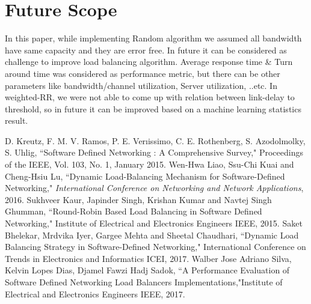 \documentclass[letterpaper, 10 pt, conference]{IEEEtran}
\begin{document}
\section{Future Scope}
\label{sec:conclusion}

In this paper, while implementing Random algorithm we assumed all bandwidth have same capacity and they are error free. In future it can be considered as challenge to improve load balancing algorithm. Average response time \& Turn around time was considered as performance metric, but there can be other parameters like bandwidth/channel utilization, Server utilization, ..etc. In weighted-RR, we were not able to come up with relation between link-delay to threshold, so in future it can be improved based on a machine learning statistics result.

 
\addtolength{\textheight}{-12cm}   %









\begin{thebibliography}{99}
 D. Kreutz, F. M. V. Ramos, P. E. Verıissimo, C. E. Rothenberg, S. Azodolmolky, S. Uhlig, ``Software Defined Networking : A Comprehensive Survey," Proceedings of the IEEE, Vol. 103, No. 1, January 2015.
 Wen-Hwa Liao, Ssu-Chi Kuai and Cheng-Hsiu Lu, ``Dynamic Load-Balancing Mechanism for Software-Defined Networking," {\it International Conference on Networking and Network Applications}, 2016.
 Sukhveer Kaur, Japinder Singh, Krishan Kumar and Navtej Singh Ghumman, ``Round-Robin Based Load Balancing in Software Defined Networking," Institute of Electrical and Electronics Engineers IEEE, 2015.
 Saket Bhelekar, Mrdvika Iyer, Gargee Mehta and Sheetal Chaudhari, ``Dynamic Load Balancing Strategy in Software-Defined Networking," International Conference on Trends in Electronics and Informatics ICEI, 2017.
 Walber Jose Adriano Silva, Kelvin Lopes Dias, Djamel Fawzi Hadj Sadok, ``A Performance Evaluation of Software Defined Networking Load Balancers Implementations,"Institute of Electrical and Electronics Engineers IEEE, 2017.
\end{thebibliography}
\end{document}
